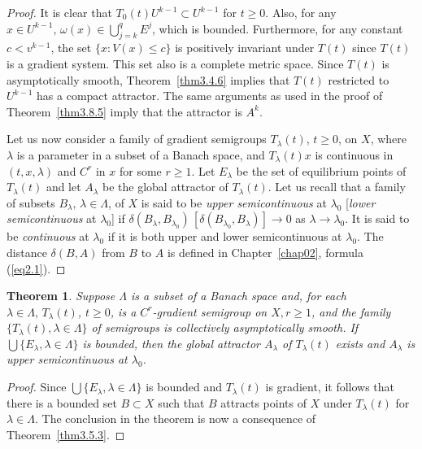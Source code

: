 \documentclass{surv-l}
\theoremstyle{plain}
\newtheorem{theorem}{Theorem}[section]
\theoremstyle{definition}
\numberwithin{equation}{section}
\numberwithin{figure}{chapter}
\begin{document}
\begin{proof} It is clear that $T_{0}(t)U^{k-1}\subset U^{k-1}$ for $t\geq 0$. Also, for any $x\in U^{k-1},\,\omega(x)\in\bigcup_{j=k}^{q}E^{j}$, which is bounded. Furthermore, for any constant $c< v^{k-1}$, the set $\{x\!:V(x)\leq c\}$ is positively invariant under $T(t)$ since $T(t)$ is a gradient system. This set also is a complete metric space. Since $T(t)$ is asymptotically smooth, Theorem~\ref{thm3.4.6} implies that $T(t)$ restricted to $U^{k-1}$ has a compact attractor. The same arguments as used in the proof of Theorem~\ref{thm3.8.5} imply that the attractor is $A^{k}$.

Let us now consider a family of gradient semigroups $T_{\lambda}(t)$, $t\geq 0$, on $X$, where $\lambda$ is a parameter in a subset of a Banach space, and $T_{\lambda}(t)x$ is continuous in $(t, x, \lambda)$ and $C^{r}$ in $x$ for some $r\geq 1$. Let $E_{\lambda}$ be the set of equilibrium points of $T_{\lambda}(t)$ and let $A_{\lambda}$ be the global attractor of $T_{\lambda}(t)$. Let us recall that a family of subsets $B_{\lambda},\, \lambda\in\Lambda$, of $X$ is said to be \emph{upper semicontinuous} at $\lambda_{0}$ [\emph{lower semicontinuous} at $\lambda_{0}$] if $\delta(B_{\lambda}, B_{\lambda_{0}})\,[\delta(B_{\lambda_{0}}, B_{\lambda})]\rightarrow 0$ as $\lambda \rightarrow\lambda_{0}$. It is said to be \emph{continuous} at $\lambda_{0}$ if it is both upper and lower semicontinuous at $\lambda_{0}$. The distance $\delta(B, A)$ from $B$ to $A$ is defined in Chapter~\ref{chap02}, formula (\ref{eq2.1}).
\end{proof}

\begin{theorem}\label{thm3.8.8} Suppose $\Lambda$ is a subset of a Banach space and, for each $\lambda \in\Lambda,\, T_{\lambda}(t)$, $t\geq 0$, is a $C^{r}$-gradient semigroup on $X, r\geq 1$, and the family $\{T_{\lambda}(t), \lambda \in \Lambda\}$ of semigroups is collectively asymptotically smooth. If\, $\bigcup\{E_{\lambda}, \lambda\in\Lambda\}$ is bounded, then the global attractor $A_{\lambda}$ of $T_{\lambda}(t)$ exists and $A_{\lambda}$ is upper semicontinuous at $\lambda_{0}$.
\end{theorem}

\begin{proof} Since $\bigcup\{E_{\lambda}, \lambda \in\Lambda\}$ is bounded and $T_{\lambda}(t)$ is gradient, it follows that there is a bounded set $B\subset X$ such that $B$ attracts points of $X$ under $T_{\lambda}(t)$ for $\lambda \in\Lambda$. The conclusion in the theorem is now a consequence of Theorem~\ref{thm3.5.3}.
\end{proof}
\end{document}

